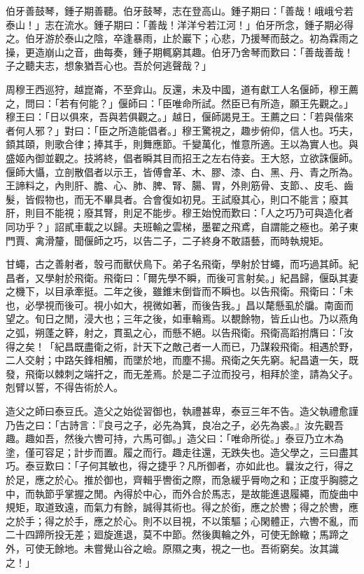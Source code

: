 \begin{pinyinscope}
伯牙善鼓琴，鍾子期善聽。伯牙鼓琴，志在登高山。鍾子期曰：「善哉！峨峨兮若泰山！」志在流水。鍾子期曰：「善哉！洋洋兮若江河！」伯牙所念，鍾子期必得之。伯牙游於泰山之陰，卒逢暴雨，止於巖下；心悲，乃援琴而鼓之。初為霖雨之操，更造崩山之音，曲每奏，鍾子期輒窮其趣。伯牙乃舍琴而歎曰：「善哉善哉！子之聽夫志，想象猶吾心也。吾於何逃聲哉？」

周穆王西巡狩，越崑崙，不至弇山。反還，未及中國，道有獻工人名偃師，穆王薦之，問曰：「若有何能？」偃師曰：「臣唯命所試。然臣已有所造，願王先觀之。」穆王曰：「日以俱來，吾與若俱觀之。」越日，偃師謁見王。王薦之曰：「若與偕來者何人邪？」對曰：「臣之所造能倡者。」穆王驚視之，趣步俯仰，信人也。巧夫，顉其頤，則歌合律；捧其手，則舞應節。千變萬化，惟意所適。王以為實人也。與盛姬內御並觀之。技將終，倡者瞬其目而招王之左右侍妾。王大怒，立欲誅偃師。偃師大懾，立剖散倡者以示王，皆傅會革、木、膠、漆、白、黑、丹、青之所為。王諦料之，內則肝、膽、心、肺、脾、腎、腸、胃，外則筋骨、支節、、皮毛、齒髮，皆假物也，而无不畢具者。合會復如初見。王試廢其心，則口不能言；廢其肝，則目不能視；廢其腎，則足不能步。穆王始悅而歎曰：「人之巧乃可與造化者同功乎？」詔貳車載之以歸。夫班輸之雲梯，墨翟之飛鳶，自謂能之極也。弟子東門賈、禽滑釐，聞偃師之巧，以告二子，二子終身不敢語藝，而時執規矩。

甘蠅，古之善射者，彀弓而獸伏鳥下。弟子名飛衛，學射於甘蠅，而巧過其師。紀昌者，又學射於飛衛。飛衛曰：「爾先學不瞬，而後可言射矣。」紀昌歸，偃臥其妻之機下，以目承牽挺。二年之後，雖錐末倒眥而不瞬也。以告飛衛。飛衛曰：「未也，必學視而後可。視小如大，視微如著，而後告我。」昌以氂懸虱於牖。南面而望之。旬日之閒，浸大也；三年之後，如車輪焉。以覩餘物，皆丘山也。乃以燕角之弧，朔蓬之簳，射之，貫虱之心，而懸不絕。以告飛衛。飛衛高蹈拊膺曰：「汝得之矣！「紀昌既盡衛之術，計天下之敵己者一人而已，乃謀殺飛衛。相遇於野，二人交射；中路矢鋒相觸，而墜於地，而塵不揚。飛衛之矢先窮。紀昌遺一矢，既發，飛衛以棘刺之端扞之，而无差焉。於是二子泣而投弓，相拜於塗，請為父子。剋臂以誓，不得告術於人。

造父之師曰泰豆氏。造父之始從習御也，執禮甚卑，泰豆三年不告。造父執禮愈謹乃告之曰：「古詩言：『良弓之子，必先為箕，良冶之子，必先為裘。』汝先觀吾趣。趣如吾，然後六轡可持，六馬可御。」造父曰：「唯命所從。」泰豆乃立木為塗，僅可容足；計步而置。履之而行。趣走往還，无跌失也。造父學之，三曰盡其巧。泰豆歎曰：「子何其敏也，得之捷乎？凡所御者，亦如此也。曩汝之行，得之於足，應之於心。推於御也，齊輯乎轡銜之際，而急緩乎脣吻之和；正度乎胸臆之中，而執節乎掌握之閒。內得於中心，而外合於馬志，是故能進退履繩，而旋曲中規矩，取道致遠，而氣力有餘，誠得其術也。得之於銜，應之於轡；得之於轡，應之於手；得之於手，應之於心。則不以目視，不以策驅；心閑體正，六轡不亂，而二十四蹄所投无差；廻旋進退，莫不中節。然後輿輪之外，可使无餘轍；馬蹄之外，可使无餘地。未嘗覺山谷之嶮。原隰之夷，視之一也。吾術窮矣。汝其識之！」


\end{pinyinscope}
